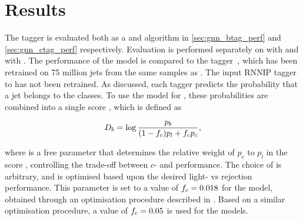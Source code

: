 \section{Results}\label{sec:gnn_results}


The \GNN tagger is evaluated both as a \btag and \ctag algorithm in \cref{sec:gnn_btag_perf} and \cref{sec:gnn_ctag_perf} respectively.
Evaluation is performed separately on \ttbarjets with \ttbarpt and \Zprimejets with \Zprimept.
The performance of the model is compared to the \DLr tagger~\cite{ATL-PHYS-PUB-2017-013,ATLAS:2022qxm}, which has been retrained on 75 million jets from the same samples as \GNN.
The input RNNIP tagger~\cite{ATL-PHYS-PUB-2017-003} to \DLr has not been retrained.
As discussed, each tagger predicts the probability that a jet belongs to the \bcl classes.
To use the model for \btag, these probabilities are combined into a single score \Db, which is defined as

\begin{equation}\label{eq:btag-disc}
    \Db = \log{\frac{p_b}{(1-\fc )p_l + \fc  p_c}} ,
\end{equation}

where \fc is a free parameter that determines the relative weight of $p_c$ to $p_l$ in the score \Db, controlling the trade-off between $c$- and \lrej performance.
The choice of \fc is arbitrary, and is optimised based upon the desired light- vs \cjet rejection performance.
This parameter is set to a value of $f_c = 0.018$ for the \DLr model, obtained through an optimisation procedure described in .
Based on a similar optimisation procedure, a value of $f_c = 0.05$ is used for the \GNN models.


